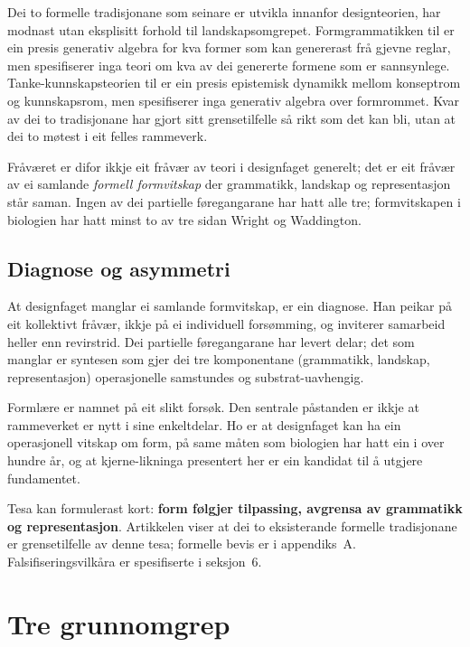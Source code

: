 \documentclass[10pt,a4paper,twocolumn]{article}
\begin{document}
Dei to formelle tradisjonane som seinare er utvikla innanfor designteorien, har modnast utan eksplisitt forhold til landskapsomgrepet. Formgrammatikken til \citet{stinygips1972} er ein presis generativ algebra for kva former som kan genererast frå gjevne reglar, men spesifiserer inga teori om kva av dei genererte formene som er sannsynlege. Tanke-kunnskapsteorien til \citet{hatchuelweil2003, hatchuelweil2009} er ein presis epistemisk dynamikk mellom konseptrom og kunnskapsrom, men spesifiserer inga generativ algebra over formrommet. Kvar av dei to tradisjonane har gjort sitt grensetilfelle så rikt som det kan bli, utan at dei to møtest i eit felles rammeverk.

Fråværet er difor ikkje eit fråvær av teori i designfaget generelt; det er eit fråvær av ei samlande \textit{formell formvitskap} der grammatikk, landskap og representasjon står saman. Ingen av dei partielle føregangarane har hatt alle tre; formvitskapen i biologien har hatt minst to av tre sidan Wright og Waddington.

\subsection{Diagnose og asymmetri}

At designfaget manglar ei samlande formvitskap, er ein diagnose. Han peikar på eit kollektivt fråvær, ikkje på ei individuell forsømming, og inviterer samarbeid heller enn revirstrid. Dei partielle føregangarane har levert delar; det som manglar er syntesen som gjer dei tre komponentane (grammatikk, landskap, representasjon) operasjonelle samstundes og substrat-uavhengig.

Formlære er namnet på eit slikt forsøk. Den sentrale påstanden er ikkje at rammeverket er nytt i sine enkeltdelar. Ho er at designfaget kan ha ein operasjonell vitskap om form, på same måten som biologien har hatt ein i over hundre år, og at kjerne-likninga presentert her er ein kandidat til å utgjere fundamentet.

Tesa kan formulerast kort: \textbf{form følgjer tilpassing, avgrensa av grammatikk og representasjon}. Artikkelen viser at dei to eksisterande formelle tradisjonane er grensetilfelle av denne tesa; formelle bevis er i appendiks~A. Falsifiseringsvilkåra er spesifiserte i seksjon~6.

\section{Tre grunnomgrep}
\end{document}
